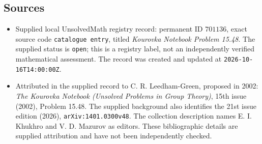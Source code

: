 \documentclass[11pt]{article}
\begin{document}
\subsection{Sources}
\begin{itemize}
\item Supplied local UnsolvedMath registry record: permanent ID \(701136\), exact source code \texttt{catalogue entry}, titled \emph{Kourovka Notebook Problem 15.48}. The supplied status is \texttt{open}; this is a registry label, not an independently verified mathematical assessment. The record was created and updated at \texttt{2026-10-16T14:00:00Z}.
\item Attributed in the supplied record to C. R. Leedham-Green, proposed in 2002: \emph{The Kourovka Notebook (Unsolved Problems in Group Theory)}, 15th issue (2002), Problem 15.48. The supplied background also identifies the 21st issue edition (2026), \texttt{arXiv:1401.0300v48}. The collection description names E. I. Khukhro and V. D. Mazurov as editors. These bibliographic details are supplied attribution and have not been independently checked.
\end{itemize}
\end{document}
